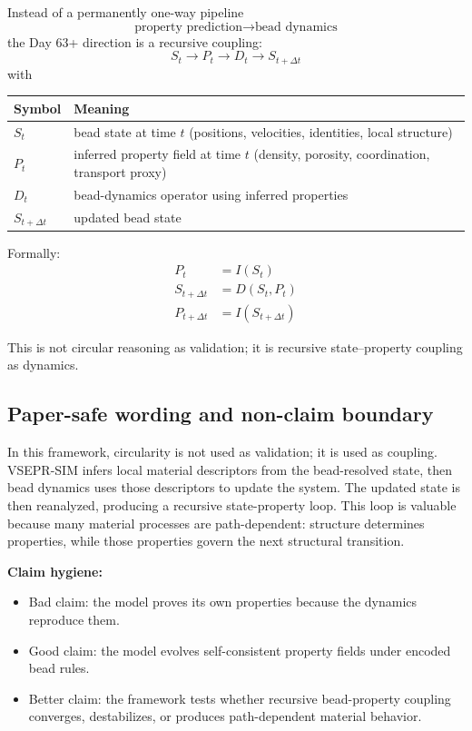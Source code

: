 \documentclass[11pt, a4paper, oneside]{article}
\begin{document}
Instead of a permanently one-way pipeline
\begin{equation}
\text{property prediction} \rightarrow \text{bead dynamics}
\end{equation}
the Day 63+ direction is a recursive coupling:
\begin{equation}
S_t \rightarrow P_t \rightarrow D_t \rightarrow S_{t+\Delta t}
\end{equation}
with
\begin{center}
\begin{tabular}{ll}
\toprule
Symbol & Meaning \\
\midrule
$S_t$ & bead state at time $t$ (positions, velocities, identities, local structure) \\
$P_t$ & inferred property field at time $t$ (density, porosity, coordination, transport proxy) \\
$D_t$ & bead-dynamics operator using inferred properties \\
$S_{t+\Delta t}$ & updated bead state \\
\bottomrule
\end{tabular}
\end{center}

Formally:
\begin{align}
P_t &= I(S_t) \\
S_{t+\Delta t} &= D(S_t, P_t) \\
P_{t+\Delta t} &= I(S_{t+\Delta t})
\end{align}

This is not circular reasoning as validation; it is recursive state--property coupling as dynamics.

\subsection{Paper-safe wording and non-claim boundary}

In this framework, circularity is not used as validation; it is used as coupling.
VSEPR-SIM infers local material descriptors from the bead-resolved state,
then bead dynamics uses those descriptors to update the system.
The updated state is then reanalyzed, producing a recursive state-property loop.
This loop is valuable because many material processes are path-dependent:
structure determines properties, while those properties govern the next structural transition.

\medskip
\noindent\textbf{Claim hygiene:}
\begin{itemize}
  \item Bad claim: the model proves its own properties because the dynamics reproduce them.
  \item Good claim: the model evolves self-consistent property fields under encoded bead rules.
  \item Better claim: the framework tests whether recursive bead-property coupling converges,
	destabilizes, or produces path-dependent material behavior.
\end{itemize}
\end{document}
